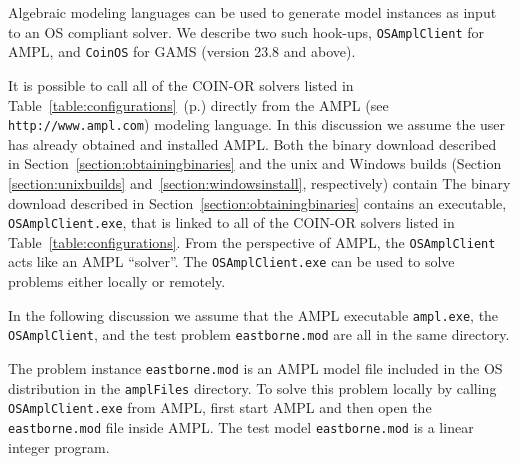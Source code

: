 \label{section:modellang}

Algebraic modeling languages can be used to generate model instances as input to an OS compliant solver.
We describe two such hook-ups, {\tt OSAmplClient} for AMPL, and {\tt CoinOS} for GAMS (version 23.8 and above).


\label{section:amplclient}





It is possible to call all of the COIN-OR solvers listed in %
Table~\ref{table:configurations}~(p.\pageref{table:configurations})
directly from the  AMPL (see {\tt http://www.ampl.com}) modeling language.  In this discussion we assume 
the user has already obtained and installed AMPL.
\ifdevelop  
Both the binary download described in Section~\ref{section:obtainingbinaries}
and the unix and Windows builds (Section \ref{section:unixbuilds}
and~\ref{section:windowsinstall}, respectively) contain
\else
The binary download described in Section~\ref{section:obtainingbinaries}
contains
\fi
an executable, {\tt OSAmplClient.exe},
that is linked to all of the COIN-OR solvers  listed in Table~\ref{table:configurations}. %
From the  perspective of AMPL, the   {\tt OSAmplClient} acts like an AMPL ``solver''.    
The {\tt OSAmplClient.exe}   can be used to solve problems either locally or remotely.   


\label{section:localampl}

In the following discussion we assume that the AMPL executable {\tt ampl.exe}, the {\tt OSAmplClient},  
and the test problem {\tt  eastborne.mod}
 are all in the same directory.  

The  problem instance {\tt eastborne.mod} is an AMPL model file included in the OS distribution 
in the {\tt amplFiles} directory.  To solve this problem locally 
by calling {\tt OSAmplClient.exe} from AMPL, first start AMPL and then open the {\tt eastborne.mod} file 
inside AMPL.  The test model {\tt eastborne.mod} is a linear integer program. 


